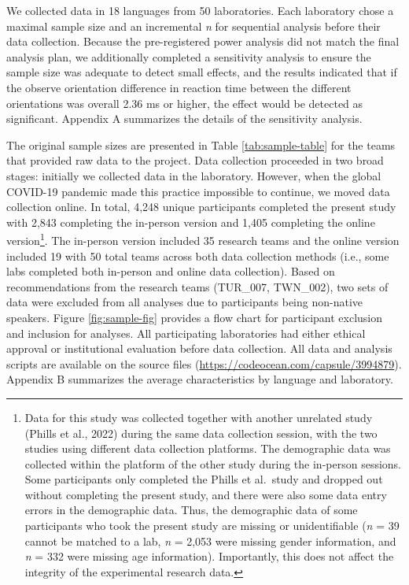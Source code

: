 \documentclass[
  man,floatsintext]{apa7}
\begin{document}
We collected data in 18 languages from
50 laboratories. Each
laboratory chose a maximal sample size and an incremental \emph{n} for
sequential analysis before their data collection. Because the
pre-registered power analysis did not match the final analysis plan, we
additionally completed a sensitivity analysis to ensure the sample size
was adequate to detect small effects, and the results indicated that if
the observe orientation difference in reaction time between the
different orientations was overall 2.36 ms or higher, the effect would
be detected as significant. Appendix A summarizes the details of the
sensitivity analysis.

The original sample sizes are presented in Table \ref{tab:sample-table}
for the teams that provided raw data to the project. Data collection
proceeded in two broad stages: initially we collected data in the
laboratory. However, when the global COVID-19 pandemic made this
practice impossible to continue, we moved data collection online. In
total,
4,248
unique participants completed the present study with
2,843
completing the in-person version and
1,405
completing the online version\footnote{Data for this study was collected together with another unrelated
  study (Phills et al., 2022) during the same data collection
  session, with the two studies using different data collection
  platforms. The demographic data was collected within the platform of
  the other study during the in-person sessions. Some participants
  only completed the Phills et al.~study and dropped out without
  completing the present study, and there were also some data entry
  errors in the demographic data. Thus, the demographic data of some
  participants who took the present study are missing or
  unidentifiable (\emph{n} =
  39
  cannot be matched to a lab, \emph{n} =
  2,053
  were missing gender information, and \emph{n} =
  332 were missing age
  information). Importantly, this does not affect the integrity of the
  experimental research data.}. The in-person version included
35
research teams and the online version included
19
with 50 total teams across both data
collection methods (i.e., some labs completed both in-person and online
data collection). Based on recommendations from the research teams
(TUR\_007, TWN\_002), two sets of data were excluded from all analyses due
to participants being non-native speakers. Figure \ref{fig:sample-fig}
provides a flow chart for participant exclusion and inclusion for
analyses. All participating laboratories had either ethical approval or
institutional evaluation before data collection. All data and analysis
scripts are available on the source files
(\url{https://codeocean.com/capsule/3994879}). Appendix B summarizes the
average characteristics by language and laboratory.
\end{document}
